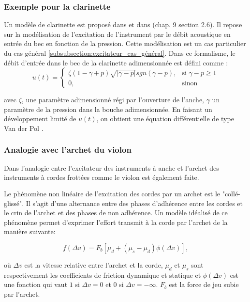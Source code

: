 \documentclass[atiam, article]{rapport} %
\begin{document}
\subsubsection{Exemple pour la clarinette}
Un modèle de clarinette est proposé dans \cite{missoum_explicit_2014} et dans \cite{chaigne2008acoustique} (chap. 9 section 2.6). Il repose sur la modélisation de l'excitation de l'instrument par le débit acoustique en entrée du bec en fonction de la pression. Cette modélisation est un cas particulier du cas général \ref{subsubsection:excitateur_cas_général}. 
Dans ce formalisme, le débit d'entrée dans le bec de la clarinette adimensionnée est défini comme : \\

\begin{equation}
    u(t) = \begin{cases}
    \zeta(1-\gamma+p)\sqrt{|\gamma-p|}sgn(\gamma-p),& \text{si }\gamma-p\geq 1\\
    0,              & \text{sinon}
\end{cases}
\end{equation}

avec $\zeta$, une paramètre adimensionné régi par l'ouverture de l'anche, $\gamma$ un paramètre de la pression dans la bouche adimensionnée. En faisant un développement limité de $u(t)$, on obtient une équation différentielle de type Van der Pol \cite{chaigne2008acoustique}.

\subsubsection{Analogie avec l'archet du violon}

Dans \cite{ollivier_idealized_2004} l'analogie entre l'excitateur des instruments à anche et l'archet des instruments à cordes frottées comme le violon est également faite. 

Le phénomène non linéaire de l'excitation des cordes par un archet est le "collé-glissé". Il s'agit d'une alternance entre des phases d'adhérence entre les cordes et le crin de l'archet et des phases de non adhérence. Un modèle idéalisé de ce phénomène permet d'exprimer l'effort transmit à la corde par l'archet de la manière suivante:

$$f(\Delta v) = F_b[\mu _d +(\mu_s - \mu_d) \phi(\Delta v)],$$

où $\Delta v$ est la vitesse relative entre l'archet et la corde, $\mu _d$ et $\mu _s$ sont respectivement les coefficients de friction dynamique et statique et $\phi(\Delta v)$ est une fonction qui vaut $1$ si $\Delta v = 0$ et $0$ si $\Delta v = -\infty$. $F_b$ est la force de jeu subie par l'archet.
\end{document}
